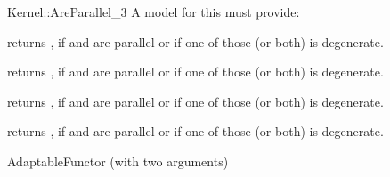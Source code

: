 \begin{ccRefFunctionObjectConcept}{Kernel::AreParallel_3}
A model for this must provide:


{returns , if  and  are parallel or if one
of those (or both) is degenerate.}

{returns , if  and  are parallel or if one
of those (or both) is degenerate.}

{returns , if  and  are parallel or if one
of those (or both) is degenerate.}

{returns , if  and  are parallel or if one
of those (or both) is degenerate.}

\ccRefines
AdaptableFunctor (with two arguments)

\ccSeeAlso
{} \\

\end{ccRefFunctionObjectConcept}
